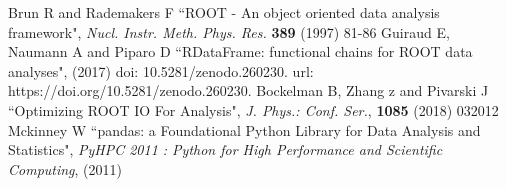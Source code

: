 \documentclass[12pt]{iopart}
\begin{document}
\begin{thebibliography}{10}

Brun R and Rademakers F ``ROOT - An object oriented data analysis framework", \textit{Nucl. Instr. Meth. Phys. Res.} \textbf{389} (1997) 81-86
Guiraud E, Naumann A and Piparo D ``RDataFrame: functional chains for ROOT data analyses", (2017) doi: 10.5281/zenodo.260230. url: https://doi.org/10.5281/zenodo.260230.
Bockelman B, Zhang z and Pivarski J ``Optimizing ROOT IO For Analysis", \textit{J. Phys.: Conf. Ser.}, \textbf{1085} (2018) 032012
Mckinney W ``pandas: a Foundational Python Library for Data Analysis and Statistics", \textit{PyHPC 2011 : Python for High Performance and Scientific Computing}, (2011)
\end{thebibliography}
\end{document}
